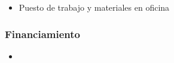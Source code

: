 \documentclass{proyectotesis}
\begin{document}
\begin{itemize}
\item Puesto de trabajo y materiales en oficina

\nocite{*}
\end{itemize}
\subsubsection*{Financiamiento}
\begin{itemize}
\item
\end{itemize}

%
%
\end{document}
